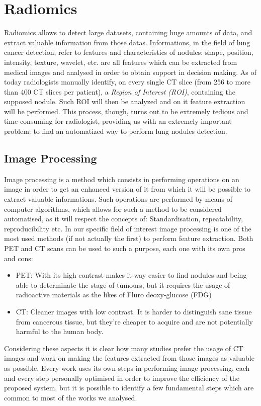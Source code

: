 \documentclass[../main.tex]{subfiles}
\begin{document}
\section{Radiomics}
Radiomics allows to detect large datasets, containing huge amounts of data, and extract valuable information from those datas. Informations, in the field of lung cancer detection, refer to features and characteristics of nodules: shape, position, intensity, texture, wavelet, etc. are all features which can be extracted from medical images and analysed in order to obtain support in decision making. \cite{Chen2017} As of today radiologists manually identify, on every single CT slice (from 256 to more than 400 CT slices per patient), a \textit{Region of Interest (ROI)}, containing the supposed nodule. Such ROI will then be analyzed and on it feature extraction will be performed. This process, though, turns out to be extremely tedious and time consuming for radiologist, providing us with an extremely important problem: to find an automatized way to perform lung nodules detection. 
\vspace{5mm}
\subsection{Image Processing}
Image processing is a method which consists in performing operations on an image in order to get an enhanced version of it from which it will be possible to extract valuable informations. Such operations are performed by means of computer algorithms, which allows for such a method to be considered automatised, as it will respect the concepts of: Standardisation, repeatability, reproducibility etc.
In our specific field of interest image processing is one of the most used methods (if not actually the first) to perform feature extraction. Both PET and CT scans can be used to such a purpose, each one with its own pros and cons:
\begin{itemize}
	\item PET: With its high contrast makes it way easier to find nodules and being able to determinate the stage of tumours, but it requires the usage of radioactive materials as the likes of Fluro deoxy-glucose (FDG)
	\item CT: Cleaner images with low contrast. It is harder to distinguish sane tissue from cancerous tissue, but they're cheaper to acquire and are not potentially harmful to the human body.
\end{itemize}

Considering these aspects it is clear how many studies prefer the usage of CT images and work on making the features extracted from those images as valuable as possible. 
Every work uses its own steps in performing image processing, each and every step personally optimised in order to improve the efficiency of the proposed system, but it is possible to identify a few fundamental steps which are common to most of the works we analysed. \cite{Khan2015,Chaudhary2012, LogeshKumar2016, Amutha2013, Mu, Punithavathy2015}
\end{document}
